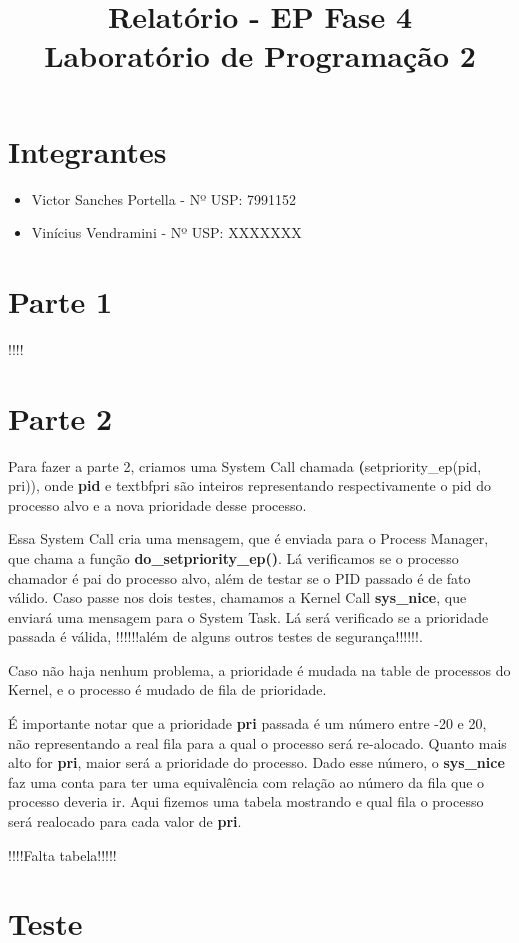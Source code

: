 \documentclass[11pt]{article}
\title{Relatório - EP Fase 4 \\ Laboratório de Programação 2}
\begin{document}
\maketitle

\section{Integrantes}

\begin{itemize}

\item Victor Sanches Portella - Nº USP: 7991152

\item Vinícius Vendramini - Nº USP: XXXXXXX



\end{itemize}

\section{Parte 1}

!!!!


\section{Parte 2}

Para fazer a parte 2, criamos uma System Call chamada \textbf(setpriority\_ep(pid, 
pri)), onde \textbf{pid} e textbf{pri} são inteiros representando respectivamente
o pid do processo alvo e a nova prioridade desse processo.

Essa System Call cria uma mensagem, que é enviada para o Process Manager, que chama
a função \textbf{do\_setpriority\_ep()}. Lá verificamos se o processo chamador é 
pai do processo alvo, além de testar se o PID passado é de fato válido. Caso 
passe nos dois testes, chamamos a Kernel Call \textbf{sys\_nice}, que enviará uma
mensagem para o System Task. Lá será verificado se a prioridade passada é válida,
!!!!!!além de alguns outros testes de segurança!!!!!!.

Caso não haja nenhum problema, a prioridade é mudada na table de processos do
Kernel, e o processo é mudado de fila de prioridade.

É importante notar que a prioridade \textbf{pri} passada é um número entre -20 e 20, 
não representando a real fila para a qual o processo será re-alocado. Quanto mais alto 
for \textbf{pri}, maior será a prioridade do processo. Dado esse número, o \textbf{sys\_nice} faz uma conta para ter uma equivalência com relação ao número da fila
que o processo deveria ir. Aqui fizemos uma tabela mostrando e qual fila o processo será
realocado para cada valor de \textbf{pri}.

!!!!Falta tabela!!!!!

\section{Teste}
\end{document}
